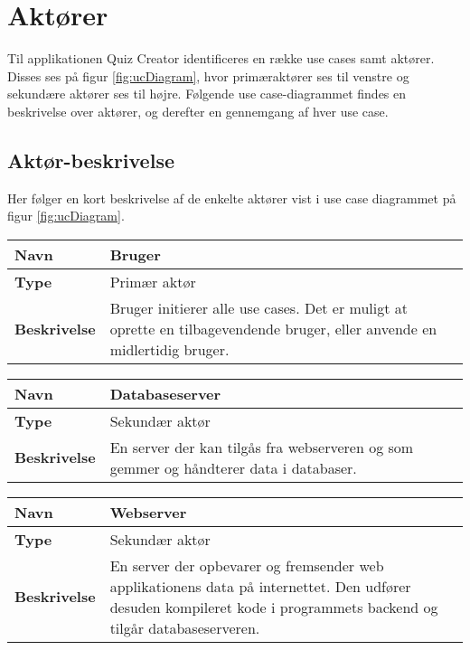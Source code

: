 \section{Aktører}

Til applikationen Quiz Creator identificeres en række use cases samt aktører. Disses ses på figur \ref{fig:ucDiagram}, hvor primæraktører ses til venstre og sekundære aktører ses til højre. Følgende use case-diagrammet findes en beskrivelse over aktører, og derefter en gennemgang af hver use case. 




\subsection{Aktør-beskrivelse}
Her følger en kort beskrivelse af de enkelte aktører vist i use case diagrammet på figur \ref{fig:ucDiagram}.

\begin{tabular}{|p{2cm}|p{12cm}|}

\hline 
\textbf{Navn} & Bruger \\ 
\hline 
\textbf{Type} & Primær aktør \\ 
\hline 
\textbf{Beskrivelse} & Bruger initierer alle use cases. Det er muligt at oprette en tilbagevendende bruger, eller anvende en midlertidig bruger.\\ 
\hline 

\end{tabular} 

\begin{tabular}{|p{2cm}|p{12cm}|}

\hline 
\textbf{Navn} & Databaseserver \\ 
\hline 
\textbf{Type} & Sekundær aktør \\ 
\hline 
\textbf{Beskrivelse} & En server der kan tilgås fra webserveren og som gemmer og håndterer data i databaser.\\ 
\hline 

\end{tabular} 

\begin{tabular}{|p{2cm}|p{12cm}|}

\hline 
\textbf{Navn} & Webserver \\ 
\hline 
\textbf{Type} & Sekundær aktør \\ 
\hline 
\textbf{Beskrivelse} & En server der opbevarer og fremsender web applikationens data på internettet. Den udfører desuden kompileret kode i programmets backend og tilgår databaseserveren. \\ 
\hline 

\end{tabular} 